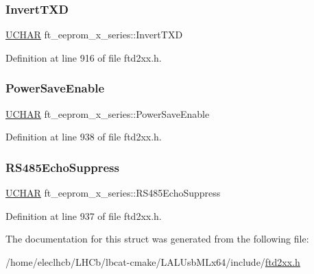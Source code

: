 \subsubsection{\texorpdfstring{Invert\+T\+XD}{InvertTXD}}
{\footnotesize\ttfamily \hyperlink{CatCaloProto40MHz_2inc_2WinTypes_8h_a4f4bb67531a9bf6f0b9c6ad76aeba587}{U\+C\+H\+AR} ft\+\_\+eeprom\+\_\+x\+\_\+series\+::\+Invert\+T\+XD}



Definition at line 916 of file ftd2xx.\+h.

\mbox{\label{structft__eeprom__x__series_adb0618ee1305d47abec850be8f315ed4}} 
\subsubsection{\texorpdfstring{Power\+Save\+Enable}{PowerSaveEnable}}
{\footnotesize\ttfamily \hyperlink{CatCaloProto40MHz_2inc_2WinTypes_8h_a4f4bb67531a9bf6f0b9c6ad76aeba587}{U\+C\+H\+AR} ft\+\_\+eeprom\+\_\+x\+\_\+series\+::\+Power\+Save\+Enable}



Definition at line 938 of file ftd2xx.\+h.

\mbox{\label{structft__eeprom__x__series_a1c3a9dc30091091132b7ec653676f589}} 
\subsubsection{\texorpdfstring{R\+S485\+Echo\+Suppress}{RS485EchoSuppress}}
{\footnotesize\ttfamily \hyperlink{CatCaloProto40MHz_2inc_2WinTypes_8h_a4f4bb67531a9bf6f0b9c6ad76aeba587}{U\+C\+H\+AR} ft\+\_\+eeprom\+\_\+x\+\_\+series\+::\+R\+S485\+Echo\+Suppress}



Definition at line 937 of file ftd2xx.\+h.



The documentation for this struct was generated from the following file\+:\begin{DoxyCompactItemize}
\item 
/home/eleclhcb/\+L\+H\+Cb/lbcat-\/cmake/\+L\+A\+L\+Usb\+M\+Lx64/include/\hyperlink{LALUsbMLx64_2include_2ftd2xx_8h}{ftd2xx.\+h}\end{DoxyCompactItemize}
